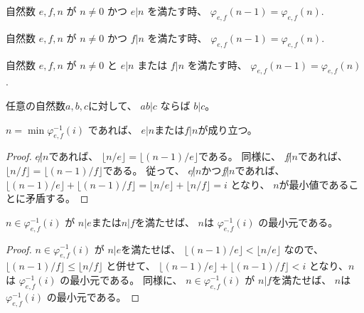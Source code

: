 \begin{lemma}
\label{lm:φ_n_minus_one_ne_φ_n_e}
自然数
$
e, f, n
$
が
$
n \ne 0
$
かつ
$
e | n
$
を満たす時、
$
\varphi_{e,f}(n-1) = \varphi_{e,f}(n)
$.
\end{lemma}

\begin{lemma}
\label{lm:φ_n_minus_one_ne_φ_n_f}
自然数
$
e, f, n
$
が
$
n \ne 0
$
かつ
$
f | n
$
を満たす時、
$
\varphi_{e,f}(n-1) = \varphi_{e,f}(n)
$.
\end{lemma}

\begin{lemma}
\label{eq:φ_n_minus_one_ne_φ_n}
自然数
$
e, f, n
$
が
$
n \ne 0
$
と
$
e | n
$
または
$
f | n
$
を満たす時、
$
\varphi_{e,f}(n-1) = \varphi_{e,f}(n)
$.
\end{lemma}

\begin{lemma}
\label{lm:nat_mul_dvd}
\leanok
任意の自然数$a,b,c$に対して、
$
ab | c
$
ならば
$
b | c
$。
\end{lemma}

\begin{lemma}
\label{lm:min_φinv_dvd}
\leanok
$n = \min \varphi_{e,f}^{-1}(i)$
であれば、
$e | n$または$f | n$が成り立つ。
\end{lemma}

\begin{proof}
$e \not | n$であれば、
$\lfloor n / e \rfloor = \lfloor (n-1) / e \rfloor$である。
同様に、
$f \not | n$であれば、
$\lfloor n / f \rfloor = \lfloor (n-1) / f \rfloor$である。
従って、
$e \not | n$かつ$f \not | n$であれば、
$
\lfloor (n-1) / e \rfloor + \lfloor (n-1) / f \rfloor
= \lfloor n / e \rfloor + \lfloor n / f \rfloor
= i
$
となり、
$n$が最小値であることに矛盾する。
\end{proof}

\begin{lemma}
\label{lm:dvd_min_φinv}
$n \in \varphi_{e,f}^{-1}(i)$
が
$n | e$または$n | f$を満たせば、
$n$は
$\varphi_{e,f}^{-1}(i)$
の最小元である。
\end{lemma}

\begin{proof}
$n \in \varphi_{e,f}^{-1}(i)$
が
$n | e$を満たせば、
$
\lfloor (n-1) / e \rfloor < \lfloor n / e \rfloor
$
なので、
$
\lfloor (n-1) / f \rfloor \le \lfloor n / f \rfloor
$
と併せて、
$\lfloor (n-1) / e \rfloor + \lfloor (n-1) / f \rfloor < i$
となり、$n$は
$\varphi_{e,f}^{-1}(i)$
の最小元である。
同様に、
$n \in \varphi_{e,f}^{-1}(i)$
が
$n | f$を満たせば、
$n$は
$\varphi_{e,f}^{-1}(i)$
の最小元である。
\end{proof}

